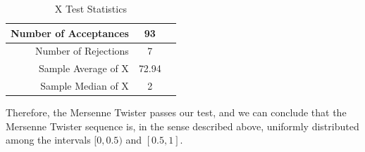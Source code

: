\documentclass{article}
\begin{document}
\begin{enumerate}
        \begin{table}[H]
            \centering
            \caption{X Test Statistics}
            \begin{tabular}{|r|c|c|} \hline
                \multicolumn{1}{|r|}{Number of Acceptances} & \multicolumn{1}{|c|}{93}   \\ \hline
                \multicolumn{1}{|r|}{Number of Rejections}  & \multicolumn{1}{|c|}{7}    \\ \hline
                \multicolumn{1}{|r|}{Sample Average of X}   & \multicolumn{1}{|c|}{72.94}   \\ \hline
                \multicolumn{1}{|r|}{Sample Median of X}   & \multicolumn{1}{|c|}{2}   \\ \hline
            \end{tabular}
            \label{tab:X}
        \end{table}

        Therefore, the Mersenne Twister passes our test, and we can conclude that the Mersenne Twister sequence is,
        in the sense described above, uniformly distributed among the intervals $[0, 0.5)$ and $[0.5, 1]$.
\end{enumerate}
\end{document}
